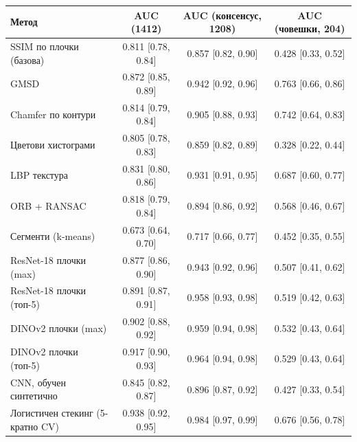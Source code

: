 \begin{tabular}{lccc}
\hline
Метод & AUC (1412) & AUC (консенсус, 1208) & AUC (човешки, 204) \\
\hline
SSIM по плочки (базова) & 0.811 [0.78, 0.84] & 0.857 [0.82, 0.90] & 0.428 [0.33, 0.52] \\
GMSD & 0.872 [0.85, 0.89] & 0.942 [0.92, 0.96] & 0.763 [0.66, 0.86] \\
Chamfer по контури & 0.814 [0.79, 0.84] & 0.905 [0.88, 0.93] & 0.742 [0.64, 0.83] \\
Цветови хистограми & 0.805 [0.78, 0.83] & 0.859 [0.82, 0.89] & 0.328 [0.22, 0.44] \\
LBP текстура & 0.831 [0.80, 0.86] & 0.931 [0.91, 0.95] & 0.687 [0.60, 0.77] \\
ORB + RANSAC & 0.818 [0.79, 0.84] & 0.894 [0.86, 0.92] & 0.568 [0.46, 0.67] \\
Сегменти (k-means) & 0.673 [0.64, 0.70] & 0.717 [0.66, 0.77] & 0.452 [0.35, 0.55] \\
ResNet-18 плочки (max) & 0.877 [0.86, 0.90] & 0.943 [0.92, 0.96] & 0.507 [0.41, 0.62] \\
ResNet-18 плочки (топ-5) & 0.891 [0.87, 0.91] & 0.958 [0.93, 0.98] & 0.519 [0.42, 0.63] \\
DINOv2 плочки (max) & 0.902 [0.88, 0.92] & 0.959 [0.94, 0.98] & 0.532 [0.43, 0.64] \\
DINOv2 плочки (топ-5) & 0.917 [0.90, 0.93] & 0.964 [0.94, 0.98] & 0.529 [0.43, 0.64] \\
CNN, обучен синтетично & 0.845 [0.82, 0.87] & 0.896 [0.87, 0.92] & 0.427 [0.33, 0.54] \\
Логистичен стекинг (5-кратно CV) & 0.938 [0.92, 0.95] & 0.984 [0.97, 0.99] & 0.676 [0.56, 0.78] \\
\hline
\end{tabular}

